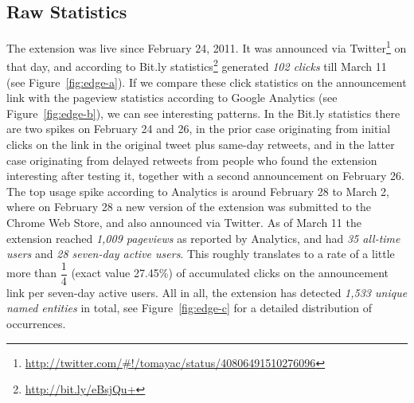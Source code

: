 \documentclass[runningheads,a4paper]{llncs}
\begin{document}
\subsection{Raw Statistics}
The extension was live since February 24, 2011. It was announced via Twitter\footnote{\url{http://twitter.com/#!/tomayac/status/40806491510276096}} on that day, and according to Bit.ly statistics\footnote{\url{http://bit.ly/eBsjQu+}} generated \textit{102 clicks} till March 11 (see Figure~\ref{fig:edge-a}). If we compare these click statistics on the announcement link with the pageview statistics according to Google Analytics (see Figure~\ref{fig:edge-b}), we can see interesting patterns. In the Bit.ly statistics there are two spikes on February 24 and 26, in the prior case originating from initial clicks on the link in the original tweet plus same-day retweets, and in the latter case originating from delayed retweets from people who found the extension interesting after testing it, together with a second announcement on February 26. The top usage spike according to Analytics is around February 28 to March 2, where on February 28 a new version of the extension was submitted to the Chrome Web Store, and also announced via Twitter. As of March 11 the extension reached \textit{1,009 pageviews} as reported by Analytics, and had \textit{35 all-time users} and \textit{28 seven-day active users}. This roughly translates to a rate of a little more than $\dfrac{1}{4}$ (exact value 27.45\%) of accumulated clicks on the announcement link per seven-day active users. All in all, the extension has detected \textit{1,533 unique named entities} in total, see Figure~\ref{fig:edge-c} for a detailed distribution of occurrences. 

\end{document}
